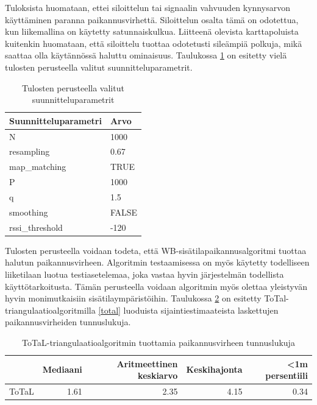 \documentclass[
  12pt,
  a4paper, twoside]{book}
\begin{document}
Tuloksista huomataan, ettei siloittelun tai signaalin vahvuuden kynnysarvon käyttäminen paranna paikannusvirhettä. Siloittelun osalta tämä on odotettua, kun liikemallina on käytetty satunnaiskulkua. Liitteenä olevista karttapoluista kuitenkin huomataan, että siloittelu tuottaa odotetusti sileämpiä polkuja, mikä saattaa olla käytännössä haluttu ominaisuus. Taulukossa \ref{tab:tulokset-final} on esitetty vielä tulosten perusteella valitut suunnitteluparametrit.

\begin{table}

\caption{\label{tab:tulokset-final}Tulosten perusteella valitut suunnitteluparametrit}
\centering
\begin{tabular}[t]{ll}
\toprule
Suunnitteluparametri & Arvo\\
\midrule
N & 1000\\
resampling & 0.67\\
map\_matching & TRUE\\
P & 1000\\
q & 1.5\\
\addlinespace
smoothing & FALSE\\
rssi\_threshold & -120\\
\bottomrule
\end{tabular}
\end{table}

Tulosten perusteella voidaan todeta, että WB-sisätilapaikannusalgoritmi tuottaa halutun paikannusvirheen. Algoritmin testaamisessa on myös käytetty todelliseen liiketilaan luotua testiasetelemaa, joka vastaa hyvin järjestelmän todellista käyttötarkoitusta. Tämän perusteella voidaan algoritmin myös olettaa yleistyvän hyvin monimutkaisiin sisätilaympäristöihin. Taulukossa \ref{tab:tulokset-total} on esitetty ToTal-triangulaatioalgoritmilla \ref{total} luoduista sijaintiestimaateista laskettujen paikannusvirheiden tunnuslukuja.

\begin{table}

\caption{\label{tab:tulokset-total}ToTaL-triangulaatioalgoritmin tuottamia paikannusvirheen tunnuslukuja}
\centering
\begin{tabular}[t]{lrrrr}
\toprule
  & Mediaani & Aritmeettinen keskiarvo & Keskihajonta & <1m persentiili\\
\midrule
ToTaL & 1.61 & 2.35 & 4.15 & 0.34\\
\bottomrule
\end{tabular}
\end{table}
\end{document}
